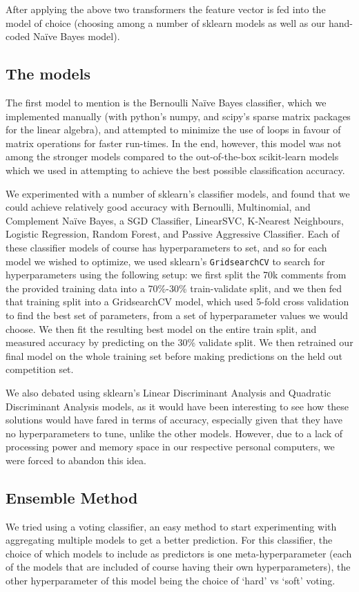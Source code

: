 \documentclass[letterpaper, 11pt]{article}
\begin{document}
After applying the above two transformers the feature vector is fed into the model of choice (choosing among a number of sklearn models as well as our hand-coded Na\"ive Bayes model). 

\subsection{The models}\label{subsec:the-models}

The first model to mention is the Bernoulli Na\"ive Bayes classifier, which we implemented manually (with python's numpy, and scipy's sparse matrix packages for the linear algebra), and attempted to minimize the use of loops in favour of matrix operations for faster run-times. In the end, however, this model was not among the stronger models compared to the out-of-the-box scikit-learn models which we used in attempting to achieve the best possible classification accuracy.

We experimented with a number of sklearn's classifier models, and found that we could achieve relatively good accuracy with Bernoulli, Multinomial, and Complement Naïve Bayes, a SGD Classifier, LinearSVC, K-Nearest Neighbours, Logistic Regression, Random Forest, and Passive Aggressive Classifier.  Each of these classifier models of course has hyperparameters to set, and so for each model we wished to optimize, we used sklearn's \texttt{GridsearchCV} to search for hyperparameters using the following setup:  we first split the 70k comments from the provided training data into a 70\%-30\% train-validate split, and we then fed that training split into a GridsearchCV model, which used 5-fold cross validation to find the best set of parameters, from a set of hyperparameter values we would choose. We then fit the resulting best model on the entire train split, and measured accuracy by predicting on the 30\% validate split. We then retrained our final model on the whole training set before making predictions on the held out competition set.

We also debated using sklearn's Linear Discriminant Analysis and Quadratic Discriminant Analysis models, as it would have been interesting to see how these solutions would have fared in terms of accuracy, especially given that they have no hyperparameters to tune, unlike the other models. However, due to a lack of processing power and memory space in our respective personal computers, we were forced to abandon this idea. 

\subsection{Ensemble Method}
We tried using a voting classifier, an easy method to start experimenting with aggregating multiple models to get a better prediction. For this classifier, the choice of which models to include as predictors is one meta-hyperparameter (each of the models  that are included of course having their own hyperparameters), the other hyperparameter of this model being the choice of `hard' vs `soft' voting.
\end{document}
